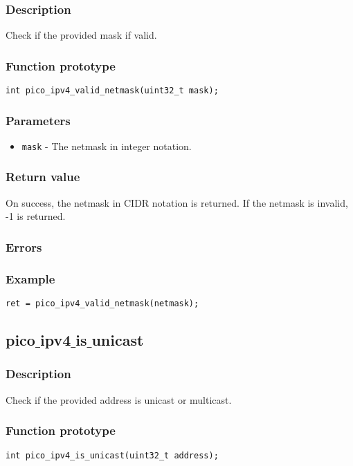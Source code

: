 \subsubsection*{Description}
Check if the provided mask if valid.

\subsubsection*{Function prototype}
\begin{verbatim}
int pico_ipv4_valid_netmask(uint32_t mask);
\end{verbatim}

\subsubsection*{Parameters}
\begin{itemize}
\item \texttt{mask} - The netmask in integer notation.
\end{itemize}

\subsubsection*{Return value}
On success, the netmask in CIDR notation is returned.
If the netmask is invalid, -1 is returned.

\subsubsection*{Errors}

\subsubsection*{Example}
\begin{verbatim}
ret = pico_ipv4_valid_netmask(netmask);
\end{verbatim}


\subsection{pico$\_$ipv4$\_$is$\_$unicast}

\subsubsection*{Description}
Check if the provided address is unicast or multicast.

\subsubsection*{Function prototype}
\begin{verbatim}
int pico_ipv4_is_unicast(uint32_t address);
\end{verbatim}

